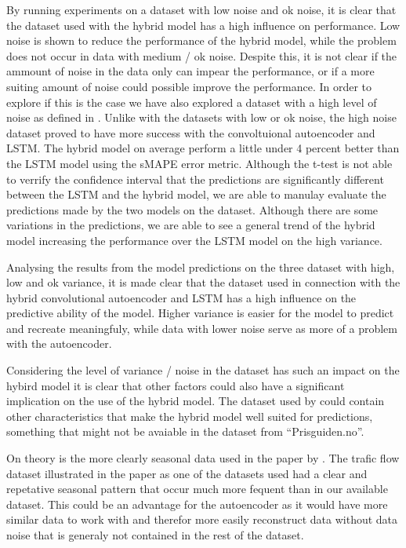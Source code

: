 By running experiments on a dataset with low noise and ok noise, it is clear that the dataset used with the hybrid model has a high influence on performance.
Low noise is shown to reduce the performance of the hybrid model, while the problem does not occur in data with medium / ok noise.
Despite this, it is not clear if the ammount of noise in the data only can impear the performance,
or if a more suiting amount of noise could possible improve the performance.
In order to explore if this is the case we have also explored a dataset with a high level of noise as defined in .
Unlike with the datasets with low or ok noise, the high noise dataset proved to have more success with the convoltuional autoencoder and LSTM.
The hybrid model on average perform a little under 4 percent better than the LSTM model using the sMAPE error metric.
Although the t-test is not able to verrify the confidence interval that the predictions are significantly different between the LSTM and the hybrid model,
we are able to manulay evaluate the predictions made by the two models on the dataset.
Although there are some variations in the predictions, we are able to see a general trend of the hybrid model increasing the performance over the LSTM model on the high variance.

Analysing the results from the model predictions on the three dataset with high, low and ok variance,
it is made clear that the dataset used in connection with the hybrid convolutional autoencoder and LSTM
has a high influence on the predictive ability of the model.
Higher variance is easier for the model to predict and recreate meaningfuly,
while data with lower noise serve as more of a problem with the autoencoder.

Considering the level of variance / noise in the dataset has such an impact on the hybird model it
is clear that other factors could also have a significant implication on the use of the hybrid model.
The dataset used by \cite{Zhao2019} could contain other characteristics that make the hybrid model well suited for predictions,
something that might not be avaiable in the dataset from ``Prisguiden.no''.

On theory is the more clearly seasonal data used in the paper by \cite{Zhao2019}.
The trafic flow dataset illustrated in the paper as one of the datasets used had a clear and repetative seasonal
pattern that occur much more fequent than in our available dataset.
This could be an advantage for the autoencoder as it would have more similar data to work with and therefor more easily
reconstruct data without data noise that is generaly not contained in the rest of the dataset.

